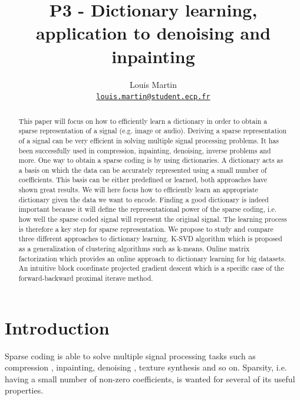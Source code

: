 \documentclass[a4paper,11pt]{article}
\title{P3 - Dictionary learning, application to denoising and inpainting}
\author{
  Louis Martin\\
  \href{mailto:louis.martin@student.ecp.fr}{\tt louis.martin@student.ecp.fr}
}
\begin{document}
\maketitle

\begin{abstract}
This paper will focus on how to efficiently learn a dictionary in order to obtain a sparse representation of a signal (e.g. image or audio).
Deriving a sparse representation of a signal can be very efficient in solving multiple signal processing problems.
It has been successfully used in compression, inpainting, denoising, inverse problems and more.
One way to obtain a sparse coding is by using dictionaries.
A dictionary acts as a basis on which the data can be accurately represented using a small number of coefficients.
This basis can be either predefined or learned, both approaches have shown great results.
We will here focus how to efficiently learn an appropriate dictionary given the data we want to encode.
Finding a good dictionary is indeed important because it will define the representational power of the sparse coding,
i.e. how well the sparse coded signal will represent the original signal.
The learning process is therefore a key step for sparse representation.
We propose to study and compare three different approaches to dictionary learning.
K-SVD algorithm which is proposed as a generalization of clustering algorithms such as k-means.
Online matrix factorization which provides an online approach to dictionary learning for big datasets.
An intuitive block coordinate projected gradient descent which is a specific case of the forward-backward proximal iterave method.

\end{abstract}

\section{Introduction}
Sparse coding is able to solve multiple signal processing tasks such as compression \cite{marcellin00}, inpainting, denoising \cite{elad06}, texture synthesis \cite{peyre09} and so on.
Sparsity, i.e. having a small number of non-zero coefficients, is wanted for several of its useful properties.
\end{document}
